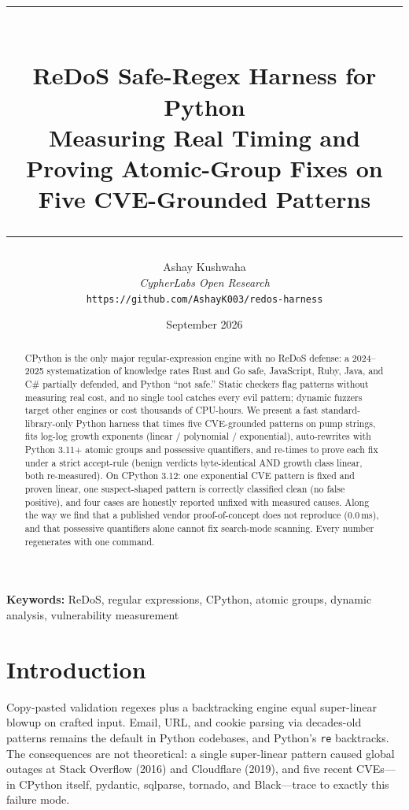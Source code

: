 \documentclass[11pt,a4paper]{article}
\title{
    \vspace{-2em}
    \rule{\textwidth}{1pt}\\[0.5em]
    \textbf{ReDoS Safe-Regex Harness for Python}\\[0.3em]
    \large Measuring Real Timing and Proving Atomic-Group Fixes on Five CVE-Grounded Patterns\\[0.5em]
    \rule{\textwidth}{1pt}
}
\author{
    Ashay Kushwaha\\
    \textit{CypherLabs Open Research}\\
    \texttt{https://github.com/AshayK003/redos-harness}
}
\date{September 2026}
\begin{document}
\maketitle

\begin{abstract}
CPython is the only major regular-expression engine with no ReDoS defense: a 2024--2025 systematization of knowledge rates Rust and Go safe, JavaScript, Ruby, Java, and C\# partially defended, and Python ``not safe.'' Static checkers flag patterns without measuring real cost, and no single tool catches every evil pattern; dynamic fuzzers target other engines or cost thousands of CPU-hours. We present a fast standard-library-only Python harness that times five CVE-grounded patterns on pump strings, fits log-log growth exponents (linear / polynomial / exponential), auto-rewrites with Python 3.11+ atomic groups and possessive quantifiers, and re-times to prove each fix under a strict accept-rule (benign verdicts byte-identical AND growth class linear, both re-measured). On CPython 3.12: one exponential CVE pattern is fixed and proven linear, one suspect-shaped pattern is correctly classified clean (no false positive), and four cases are honestly reported unfixed with measured causes. Along the way we find that a published vendor proof-of-concept does not reproduce (0.0\,ms), and that possessive quantifiers alone cannot fix search-mode scanning. Every number regenerates with one command.
\end{abstract}

\vspace{1em}
\noindent\textbf{Keywords:} ReDoS, regular expressions, CPython, atomic groups, dynamic analysis, vulnerability measurement

\newpage
\tableofcontents
\newpage

\section{Introduction}

Copy-pasted validation regexes plus a backtracking engine equal super-linear blowup on crafted input. Email, URL, and cookie parsing via decades-old patterns remains the default in Python codebases, and Python's \verb!re! backtracks. The consequences are not theoretical: a single super-linear pattern caused global outages at Stack Overflow (2016) and Cloudflare (2019), and five recent CVEs---in CPython itself, pydantic, sqlparse, tornado, and Black---trace to exactly this failure mode.
\end{document}
